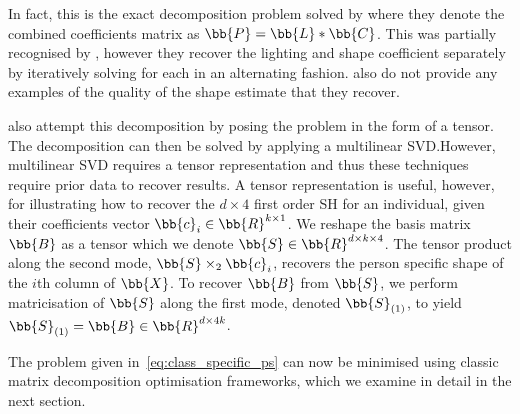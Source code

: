 In fact, this is the exact decomposition problem
solved by \citet{KemelmacherShlizerman:2013iv} where they denote the combined
coefficients matrix as $\bb{P} = \bb{L} \ast \bb{C}$. This was partially
recognised by \citet{zhou2007appearance}, however they recover the lighting and
shape coefficient separately by iteratively solving for each in an alternating
fashion. \citet{zhou2007appearance} also do not provide any examples of the
quality of the shape estimate that they recover.

\citet{minsik2014realtime,minsik2011fast} also attempt this decomposition by
posing the problem in the form of a tensor. The decomposition can then be solved
by applying a multilinear SVD.\@ However, multilinear SVD requires a tensor
representation and thus these techniques require prior data to recover results.
A tensor representation is useful, however, for illustrating how to recover the
$d \times 4$ first order SH for an individual, given their coefficients vector
$\bb{c}_i \in \bb{R}^{k \times 1}$. We reshape the basis matrix
$\bb{B}$ as a tensor which we denote $\bb{S} \in \bb{R}^{d \times k
\times 4}$. The tensor product along the second mode, $\bb{S} \times_2 \bb{c}_i$,
recovers the person specific shape of the $i$th column of
$\bb{X}$. To recover $\bb{B}$ from $\bb{S}$, we perform
matricisation of $\bb{S}$ along the first mode, denoted $\bb{S}_{(1)}$,
to yield $\bb{S}_{(1)} = \bb{B} \in \bb{R}^{d \times 4k}$.

The problem given in~\eqref{eq:class_specific_ps} can now be minimised using
classic matrix decomposition optimisation frameworks, which we examine in
detail in the next section.
